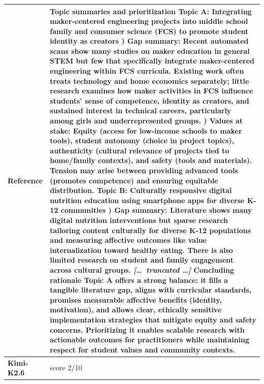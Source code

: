 \begin{longtable}{@{}l p{12.5cm}@{}}
  \textbf{Reference} & Topic summaries and prioritization \newline Topic A: Integrating maker-centered engineering projects into middle school family and consumer science (FCS) to promote student identity as creators \newline 1) Gap summary: Recent automated scans show many studies on maker education in general STEM but few that specifically integrate maker-centered engineering within FCS curricula. Existing work often treats technology and home economics separately; little research examines how maker activities in FCS influence students' sense of competence, identity as creators, and sustained interest in technical careers, particularly among girls and underrepresented groups. \newline 2) Values at stake: Equity (access for low-income schools to maker tools), student autonomy (choice in project topics), authenticity (cultural relevance of projects tied to home/family contexts), and safety (tools and materials). Tension may arise between providing advanced tools (promotes competence) and ensuring equitable distribution. \newline Topic B: Culturally responsive digital nutrition education using smartphone apps for diverse K-12 communities \newline 1) Gap summary: Literature shows many digital nutrition interventions but sparse research tailoring content culturally for diverse K-12 populations and measuring affective outcomes like value internalization toward healthy eating. There is also limited research on student and family engagement across cultural groups. \newline \textit{[\ldots\ truncated \ldots]} \newline Concluding rationale \newline Topic A offers a strong balance: it fills a tangible literature gap, aligns with curricular standards, promises measurable affective benefits (identity, motivation), and allows clear, ethically sensitive implementation strategies that mitigate equity and safety concerns. Prioritizing it enables scalable research with actionable outcomes for practitioners while maintaining respect for student values and community contexts. \\
  \midrule
  \textbf{Kimi-K2.6} & score 2/10 \\

\end{longtable}

